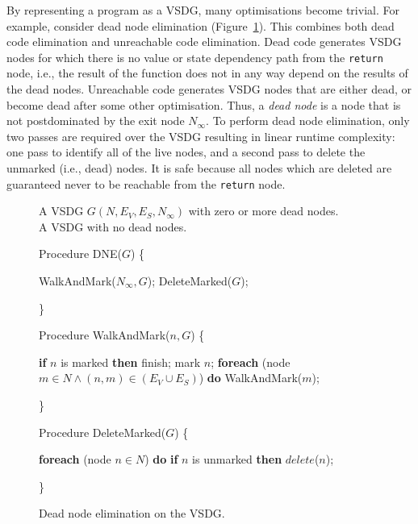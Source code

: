 By representing a program as a VSDG, many optimisations become trivial. For example, consider dead node elimination (Figure~\ref{fig:dnevsdg}). This combines both dead code elimination and unreachable code elimination. Dead code generates VSDG nodes for which there is no value or state dependency path from the \texttt{return} node, i.e., the result of the function does not in any way depend on the results of the dead nodes. Unreachable code generates VSDG nodes that are either dead, or become dead after some other optimisation. Thus, a \textit{dead node} is a node that is not postdominated by the exit node $N_{\infty}$. To perform dead node elimination, only two passes are required over the VSDG resulting in linear runtime complexity: one pass to identify all of the live nodes, and a second pass to delete the unmarked (i.e., dead) nodes. It is safe because all nodes which are deleted are guaranteed never to be reachable from the \texttt{return} node.

\begin{figure}[!ht]
\centering
\begin{minipage}[t]{5in}
 A VSDG $G(N,E_V,E_S,N_{\infty})$ with zero or more dead nodes.\\
 A VSDG with no dead nodes.
\setcounter{linectr}{0}

Procedure DNE($G$) \{
\begin{code}
 WalkAndMark($N_{\infty},G$);
 DeleteMarked($G$);
\end{code}
\}

\setcounter{linectr}{0}
Procedure WalkAndMark($n,G$) \{
\begin{code}
 {\bf if} $n$ is marked {\bf then} finish;
 mark $n$;
 {\bf foreach} (node $m \in N \wedge (n,m) \in (E_V \cup E_S)$) {\bf do}
    WalkAndMark($m$);
\end{code}
\}

\setcounter{linectr}{0}
Procedure DeleteMarked($G$) \{
\begin{code}
 {\bf foreach} (node $n \in N$) {\bf do}
    {\bf if} $n$ is unmarked {\bf then} $delete$($n$);
\end{code}
\}

\end{minipage}
\caption{Dead node elimination on the VSDG.}
\label{fig:dnevsdg}
\end{figure}

